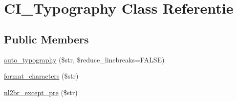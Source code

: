 \hypertarget{class_c_i___typography}{}\section{C\+I\+\_\+\+Typography Class Referentie}
\label{class_c_i___typography}
\subsection*{Public Members}
\begin{DoxyCompactItemize}
\item 
\mbox{\hyperlink{class_c_i___typography_a24c284b560f34d6c7fad07e36baaa024}{auto\+\_\+typography}} (\$str, \$reduce\+\_\+linebreaks=F\+A\+L\+SE)
\item 
\mbox{\hyperlink{class_c_i___typography_a45df135c8811c2b27085dbdfd05a1eed}{format\+\_\+characters}} (\$str)
\item 
\mbox{\hyperlink{class_c_i___typography_af9db9732eaa94a62b3a3ccc7f6bf860b}{nl2br\+\_\+except\+\_\+pre}} (\$str)
\end{DoxyCompactItemize}
